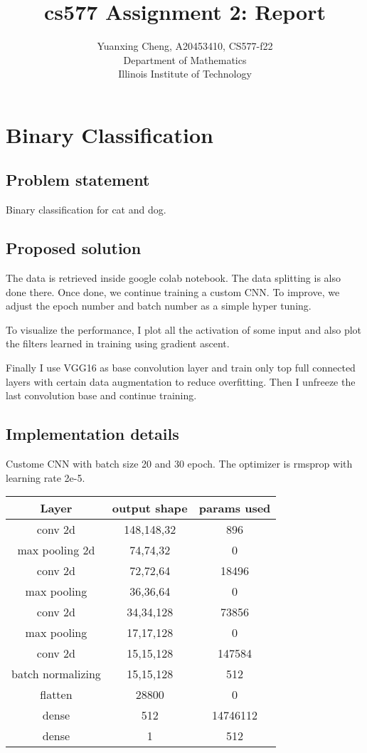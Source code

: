 \documentclass{article}
\title{cs577 Assignment 2: Report}
\author{Yuanxing Cheng, A20453410, CS577-f22\\ Department of Mathematics \\Illinois Institute of Technology}
\begin{document}
\maketitle
\section{Binary Classification}
\subsection*{Problem statement}

Binary classification for cat and dog.

\subsection*{Proposed solution}

The data is retrieved inside google colab notebook. The data splitting is also done there. Once done, we continue training a custom CNN. To improve, we adjust the epoch number and batch number as a simple hyper tuning.

To visualize the performance, I plot all the activation of some input and also plot the filters learned in training using gradient ascent.

Finally I use VGG16 as base convolution layer and train only top full connected layers with certain data augmentation to reduce overfitting. Then I unfreeze the last convolution base and continue training.

\subsection*{Implementation details}

Custome CNN with batch size 20 and 30 epoch. The optimizer is rmsprop with learning rate 2e-5.

\begin{center}
    \begin{tabular}{ccc}
        \hline
        Layer & output shape & params used\\
        \hline 
        conv 2d & 148,148,32 & 896\\
        max pooling 2d & 74,74,32 & 0\\
        conv 2d & 72,72,64 & 18496\\
        max pooling & 36,36,64 & 0\\
        conv 2d & 34,34,128 & 73856\\
        max pooling & 17,17,128 & 0\\
        conv 2d & 15,15,128 & 147584\\
        batch normalizing & 15,15,128 & 512\\
        flatten & 28800 & 0\\
        dense & 512 & 14746112\\
        dense & 1 & 512\\ \hline   
    \end{tabular}
\end{center}
\end{document}
